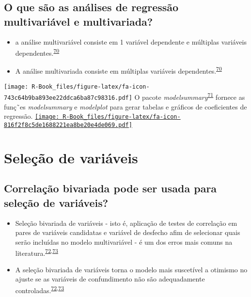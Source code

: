 \documentclass[
]{book}
\begin{document}
\hypertarget{o-que-suxe3o-as-anuxe1lises-de-regressuxe3o-multivariuxe1vel-e-multivariada}{%
\subsection{O que são as análises de regressão multivariável e multivariada?}\label{o-que-suxe3o-as-anuxe1lises-de-regressuxe3o-multivariuxe1vel-e-multivariada}}

\begin{itemize}
\item
  a análise multivariável consiste em 1 variável dependente e múltiplas variáveis dependentes.\textsuperscript{\protect\hyperlink{ref-Hidalgo2013}{70}}
\item
  A análise multivariada consiste em múltiplas variáveis dependentes.\textsuperscript{\protect\hyperlink{ref-Hidalgo2013}{70}}
\end{itemize}

\texttt{[image: R-Book\_files/figure-latex/fa-icon-743c64b9ba893ee22ddca6ba87c98316.pdf]} O pacote \emph{modelsummary}\textsuperscript{\protect\hyperlink{ref-modelsummary}{71}} fornece as funç˜es \emph{modelsummary} e \emph{modelplot} para gerar tabelas e gráficos de coeficientes de regressão. \href{https://cloud.r-project.org/web/packages/modelsummary/index.html}{\texttt{[image: R-Book\_files/figure-latex/fa-icon-816f2f8c5de1688221ea8be20e4de069.pdf]}}

\hypertarget{selecao}{%
\section{Seleção de variáveis}\label{selecao}}

\hypertarget{correlauxe7uxe3o-bivariada-pode-ser-usada-para-seleuxe7uxe3o-de-variuxe1veis}{%
\subsection{Correlação bivariada pode ser usada para seleção de variáveis?}\label{correlauxe7uxe3o-bivariada-pode-ser-usada-para-seleuxe7uxe3o-de-variuxe1veis}}

\begin{itemize}
\item
  Seleção bivariada de variáveis - isto é, aplicação de testes de correlação em pares de variáveis candidatas e variável de desfecho afim de selecionar quais serão incluídas no modelo multivariável - é um dos erros mais comuns na literatura.\textsuperscript{\protect\hyperlink{ref-Dales1978}{72},\protect\hyperlink{ref-Sun1996}{73}}
\item
  A seleção bivariada de variáveis torna o modelo mais suscetível a otimismo no ajuste se as variáveis de confundimento não são adequadamente controladas.\textsuperscript{\protect\hyperlink{ref-Dales1978}{72},\protect\hyperlink{ref-Sun1996}{73}}
\end{itemize}
\end{document}
